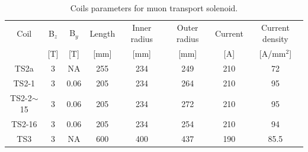 \begin{table}[H]
 \centering
 \begin{tabular}{cccccccc} \hline \hline
  Coil & B$_z$ & B$_y$ & Length & Inner radius & Outer radius & Current & Current density \\
   & [T] & [T] & [mm] & [mm] & [mm] & [A] & [A/mm$^2$] \\ \hline
  TS2a & 3 & NA & 255 & 234 & 249 & 210 & 72 \\
  TS2-1 & 3 & 0.06 & 205 & 234 & 264 & 210 & 95 \\
  TS2-2$\sim$15 & 3 & 0.06 & 205 & 234 & 272 & 210 & 95 \\
  TS2-16 & 3 & 0.06 & 205 & 234 & 254 & 210 & 94 \\
  TS3 & 3 & NA & 600 & 400 & 437 & 190 & 85.5 \\ \hline \hline
 \end{tabular}
 \caption{Coils parameters for muon transport solenoid.}
 \label{tscoil}
\end{table}



